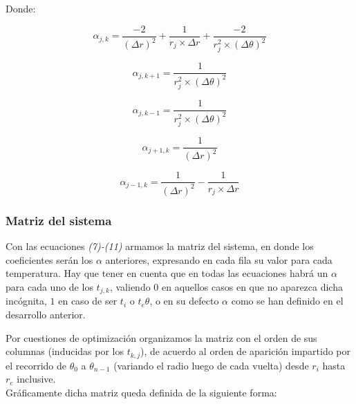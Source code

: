 Donde:

\begin{equation}
\alpha_{j,k} = \frac{-2}{(\Delta r)^2} + \frac{1}{r_j \times \Delta r} + \frac{-2}{r_j^2 \times (\Delta \theta)^2}
\end{equation}

\begin{equation}
\alpha_{j,k+1} = \frac{1}{r_j^2 \times (\Delta \theta)^2}
\end{equation}

\begin{equation}
\alpha_{j,k-1} = \frac{1}{r_j^2 \times (\Delta \theta)^2}
\end{equation}

\begin{equation}
\alpha_{j+1,k} = \frac{1}{(\Delta r)^2}
\end{equation}

\begin{equation}
\alpha_{j-1,k} = \frac{1}{(\Delta r)^2} - \frac{1}{r_j \times \Delta r}
\end{equation}


\subsubsection{Matriz del sistema}

Con las ecuaciones \textit{(7)-(11)} armamos la matriz del sistema, en donde los coeficientes ser\'an los $\alpha$ anteriores, expresando en cada fila su valor para cada temperatura. Hay que tener en cuenta que en todas las ecuaciones habr\'a un $\alpha$ para cada uno de los $t_{j,k}$, valiendo $0$ en aquellos casos en que no aparezca dicha incógnita, $1$ en caso de ser $t_i$ o $t_e{\theta}$, o en su defecto $\alpha$ como se han definido en el desarrollo anterior.

Por cuestiones de optimizaci\'on organizamos la matriz con el orden de sus columnas (inducidas por los $t_{k,j}$), de acuerdo al orden de aparici\'on impartido por el recorrido de $\theta_0$ a $\theta_{n-1}$ (variando el radio luego de cada vuelta) desde $r_i$ hasta $r_e$ inclusive.
\\
Gráficamente dicha matriz queda definida de la siguiente forma:
\\

